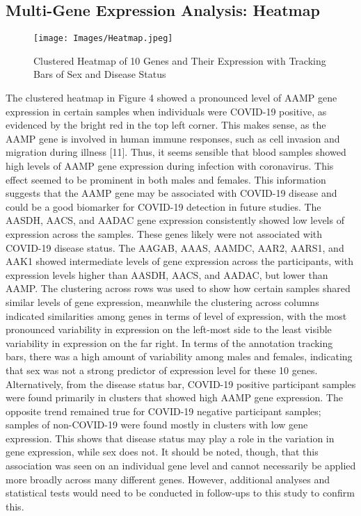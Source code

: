 \documentclass{article}
\begin{document}
\newpage
\subsection{Multi-Gene Expression Analysis: Heatmap}
\begin{figure}[hbt!]
    \centering
    \texttt{[image: Images/Heatmap.jpeg]}
    \caption{Clustered Heatmap of 10 Genes and Their Expression with Tracking Bars of Sex and Disease Status}
    \label{Heatmap}
\end{figure}
The clustered heatmap in Figure 4 showed a pronounced level of AAMP gene expression in certain samples when individuals were COVID-19 positive, as evidenced by the bright red in the top left corner. This makes sense, as the AAMP gene is involved in human immune responses, such as cell invasion and migration during illness [11]. Thus, it seems sensible that blood samples showed high levels of AAMP gene expression during infection with coronavirus. This effect seemed to be prominent in both males and females. This information suggests that the AAMP gene may be associated with COVID-19 disease and could be a good biomarker for COVID-19 detection in future studies. The AASDH, AACS, and AADAC gene expression consistently showed low levels of expression across the samples. These genes likely were not associated with COVID-19 disease status. The AAGAB, AAAS, AAMDC, AAR2, AARS1, and AAK1 showed intermediate levels of gene expression across the participants, with expression levels higher than AASDH, AACS, and AADAC, but lower than AAMP. The clustering across rows was used to show how certain samples shared similar levels of gene expression, meanwhile the clustering across columns indicated similarities among genes in terms of level of expression, with the most pronounced variability in expression on the left-most side to the least visible variability in expression on the far right. In terms of the annotation tracking bars, there was a high amount of variability among males and females, indicating that sex was not a strong predictor of expression level for these 10 genes. Alternatively, from the disease status bar, COVID-19 positive participant samples were found primarily in clusters that showed high AAMP gene expression. The opposite trend remained true for COVID-19 negative participant samples; samples of non-COVID-19 were found mostly in clusters with low gene expression. This shows that disease status may play a role in the variation in gene expression, while sex does not. It should be noted, though, that this association was seen on an individual gene level and cannot necessarily be applied more broadly across many different genes. However, additional analyses and statistical tests would need to be conducted in follow-ups to this study to confirm this. 
\newpage
\end{document}
